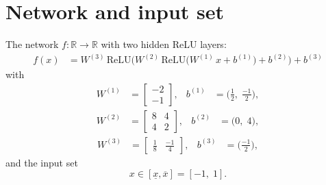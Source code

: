 \documentclass[11pt]{article}
\begin{document}
\section{Network and input set}
The network $f:\mathbb{R} \to \mathbb{R}$ with two hidden ReLU layers:
\begin{align*}
f(x) &= W^{(3)}\,\mathrm{ReLU}\bigl(W^{(2)}\,\mathrm{ReLU}\bigl(W^{(1)}\,x + b^{(1)}\bigr) + b^{(2)}\bigr) + b^{(3)}
\end{align*}
with
\begin{align*}
W^{(1)} &= \begin{bmatrix}
-2 \\
-1
\end{bmatrix}, & b^{(1)} &= \bigl(\frac{1}{2},\; \frac{-1}{2}\bigr),
\end{align*}
\begin{align*}
W^{(2)} &= \begin{bmatrix}
8 & 4 \\
4 & 2
\end{bmatrix}, & b^{(2)} &= \bigl(0,\; 4\bigr),
\end{align*}
\begin{align*}
W^{(3)} &= \begin{bmatrix}
\frac{1}{8} & \frac{-1}{4}
\end{bmatrix}, & b^{(3)} &= \bigl(\frac{-1}{2}\bigr),
\end{align*}
and the input set
\begin{equation*}
 x \in [\underline{x}, \overline{x}] = [-1,\; 1].
\end{equation*}
\end{document}
